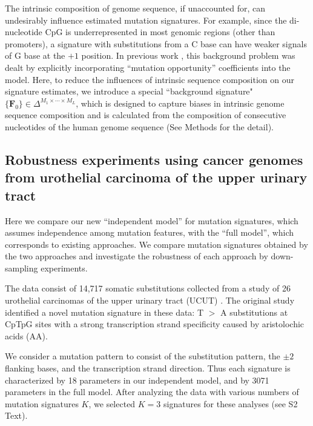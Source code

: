 \documentclass[10pt,letterpaper]{article}
\begin{document}
The intrinsic composition of genome sequence, if unaccounted for, can undesirably influence estimated mutation signatures.
For example, since the di-nucleotide CpG is underrepresented in most genomic regions (other than promoters), 
a signature with substitutions from a C base can have weaker signals of G base at the $+1$ position.
In previous work \cite{pmid23628380}, this background problem was dealt by explicitly incorporating ``mutation opportunity'' coefficients into the model.
Here, to reduce the influences of intrinsic sequence composition on our signature estimates, we introduce a special ``background signature"
$\{ \bm{F}_{0} \} \in \Delta^{M_1 \times \cdots \times M_L}$, 
which is designed to capture biases in intrinsic genome sequence composition and is calculated from the composition of consecutive nucleotides of the human genome sequence 
(See Methods for the detail).




\subsection*{Robustness experiments using cancer genomes from urothelial carcinoma of the upper urinary tract}

Here we compare our new ``independent model'' for 
mutation signatures, which assumes independence
among mutation features,
with the ``full model'', which corresponds to existing approaches. We compare mutation signatures obtained by the two approaches and investigate the robustness of each approach by down-sampling experiments.

The data consist of 14,717 somatic substitutions 
collected from a study of 26 urothelial carcinomas of the upper urinary tract (UCUT) \cite{pmid23926200}.
The original study identified a novel mutation signature in these data: 
T $>$ A substitutions at CpTpG sites with a strong transcription strand specificity caused by aristolochic acids (AA).

We consider a mutation pattern to consist of the substitution pattern, the $\pm 2$ flanking bases, and the transcription strand direction. Thus each signature is characterized by 18 parameters in our independent model, and by 3071 parameters in the full model. After analyzing the data with various numbers of mutation signatures $K$,
we selected $K=3$ signatures for these analyses (see S2 Text).
\end{document}
